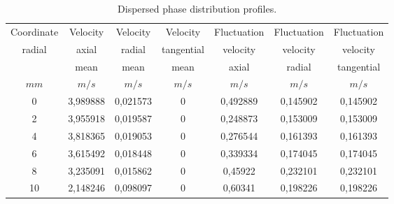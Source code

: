 \begin{itemize}
\begin{table}[H]
   \begin{center}
      \begin{tabular}{|c|c|c|c|c|c|c|} \hline
         Coordinate  & Velocity    & Velocity    & Velocity   &
         Fluctuation & Fluctuation & Fluctuation                                               \\
         radial      & axial       & radial      & tangential & velocity
                     & velocity    & velocity                                                  \\
                     & mean        & mean        & mean       & axial
                     & radial      & tangential                                                \\
         $mm$        & $m/s$       & $m/s$       & $m/s$      & $m/s$    & $m/s$    & $m/s$    \\ \hline
         0           & 3,989888    & 0,021573    & 0          & 0,492889 & 0,145902 & 0,145902 \\ \hline
         2           & 3,955918    & 0,019587    & 0          & 0,248873 & 0,153009 & 0,153009 \\ \hline
         4           & 3,818365    & 0,019053    & 0          & 0,276544 & 0,161393 & 0,161393 \\ \hline
         6           & 3,615492    & 0,018448    & 0          & 0,339334 & 0,174045 & 0,174045 \\ \hline
         8           & 3,235091    & 0,015862    & 0          & 0,45922  & 0,232101 & 0,232101 \\ \hline
         10          & 2,148246    & 0,098097    & 0          & 0,60341  & 0,198226 & 0,198226 \\ \hline
      \end{tabular}
   \end{center}
   \caption{Dispersed phase distribution profiles.}
   \label{CL_part}
\end{table}


\end{itemize}
